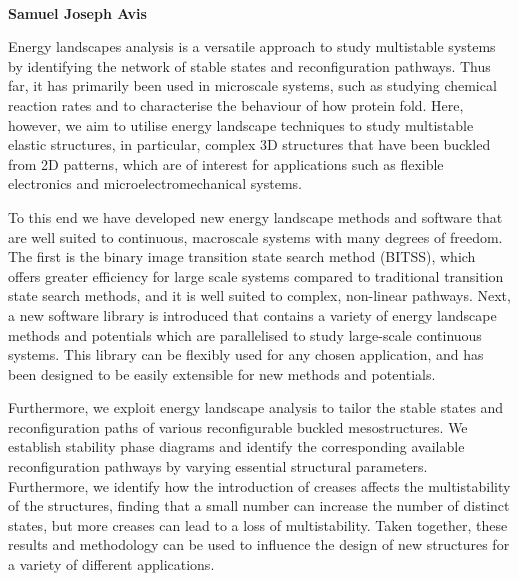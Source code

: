 \begin{center}
  \textbf{\Large \thesisTitle}\\
  \textbf{\large Samuel Joseph Avis}\\
\end{center}
Energy landscapes analysis is a versatile approach to study multistable systems by identifying the network of stable states and reconfiguration pathways.
Thus far, it has primarily been used in microscale systems, such as studying chemical reaction rates and to characterise the behaviour of how protein fold.
Here, however, we aim to utilise energy landscape techniques to study multistable elastic structures, in particular, complex 3D structures that have been buckled from 2D patterns, which are of interest for applications such as flexible electronics and microelectromechanical systems.

To this end we have developed new energy landscape methods and software that are well suited to continuous, macroscale systems with many degrees of freedom.
The first is the binary image transition state search method (BITSS), which offers greater efficiency for large scale systems compared to traditional transition state search methods, and it is well suited to complex, non-linear pathways.
Next, a new software library is introduced that contains a variety of energy landscape methods and potentials which are parallelised to study large-scale continuous systems.
This library can be flexibly used for any chosen application, and has been designed to be easily extensible for new methods and potentials.

Furthermore, we exploit energy landscape analysis to tailor the stable states and reconfiguration paths of various reconfigurable buckled mesostructures.
We establish stability phase diagrams and identify the corresponding available reconfiguration pathways by varying essential structural parameters.
Furthermore, we identify how the introduction of creases affects the multistability of the structures, finding that a small number can increase the number of distinct states, but more creases can lead to a loss of multistability.
Taken together, these results and methodology can be used to influence the design of new structures for a variety of different applications.



